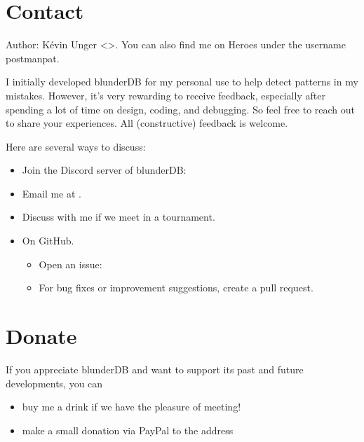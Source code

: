 \documentclass[letterpaper,10pt,english]{sphinxmanual}
\begin{document}
\chapter{Contact}
\label{\detokenize{index:contacts}}\label{\detokenize{index:id1}}
\sphinxAtStartPar
Author: Kévin Unger \textless{}\textgreater{}. You can also find me on Heroes under the username postmanpat.

\sphinxAtStartPar
I initially developed blunderDB for my personal use to help detect patterns in my mistakes. However, it’s very rewarding to receive feedback, especially after spending a lot of time on design, coding, and debugging. So feel free to reach out to share your experiences. All (constructive) feedback is welcome.

\sphinxAtStartPar
Here are several ways to discuss:
\begin{itemize}
\item {} 
\sphinxAtStartPar
Join the Discord server of blunderDB: 

\item {} 
\sphinxAtStartPar
Email me at .

\item {} 
\sphinxAtStartPar
Discuss with me if we meet in a tournament.

\item {} 
\sphinxAtStartPar
On GitHub.
\begin{itemize}
\item {} 
\sphinxAtStartPar
Open an issue: 

\item {} 
\sphinxAtStartPar
For bug fixes or improvement suggestions, create a pull request.

\end{itemize}

\end{itemize}


\chapter{Donate}
\label{\detokenize{index:faire-un-don}}
\sphinxAtStartPar
If you appreciate blunderDB and want to support its past and future developments, you can
\begin{itemize}
\item {} 
\sphinxAtStartPar
buy me a drink if we have the pleasure of meeting!

\item {} 
\sphinxAtStartPar
make a small donation via PayPal to the address 

\end{itemize}
\end{document}
